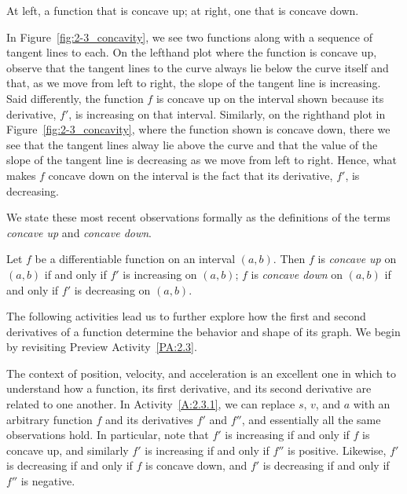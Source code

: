 \begin{marginfigure}[0cm] %
\caption{At left, a function that is concave up; at right, one that is concave down.}\label{fig:2-3_concavity}
\end{marginfigure}

In Figure~\ref{fig:2-3_concavity}, we see two functions along with a sequence of tangent lines to each.  On the lefthand plot where the function is concave up, observe that the tangent lines to the curve always lie below the curve itself and that, as we move from left to right, the slope of the tangent line is increasing.  Said differently, the function $f$ is concave up on the interval shown because its derivative, $f'$, is increasing on that interval.  Similarly, on the righthand plot in Figure~\ref{fig:2-3_concavity}, where the function shown is concave down, there we see that the tangent lines alway lie above the curve and that the value of the slope of the tangent line is decreasing as we move from left to right.  Hence, what makes $f$ concave down on the interval is the fact that its derivative, $f'$, is decreasing.

We state these most recent observations formally as the definitions of the terms \emph{concave up} and \emph{concave down}.

{Let $f$ be a differentiable function on an interval $(a,b)$.  Then $f$ is \emph{concave up}  on $(a,b)$ if and only if $f'$ is increasing on $(a,b)$;  $f$ is \emph{concave down}  on $(a,b)$ if and only if $f'$ is decreasing on $(a,b)$.
} %


The following activities lead us to further explore how the first and second derivatives of a function determine the behavior and shape of its graph.  We begin by revisiting Preview Activity~\ref{PA:2.3}.


The context of position, velocity, and acceleration is an excellent one in which to understand how a function, its first derivative, and its second derivative are related to one another.  In Activity~\ref{A:2.3.1}, we can replace $s$, $v$, and $a$ with an arbitrary function $f$ and its derivatives $f'$ and $f''$, and essentially all the same observations hold.  In particular, note that $f'$ is increasing if and only if $f$ is concave up, and similarly $f'$ is increasing if and only if $f''$ is positive.  Likewise, $f'$ is decreasing if and only if $f$ is concave down, and $f'$ is decreasing if and only if $f''$ is negative.

